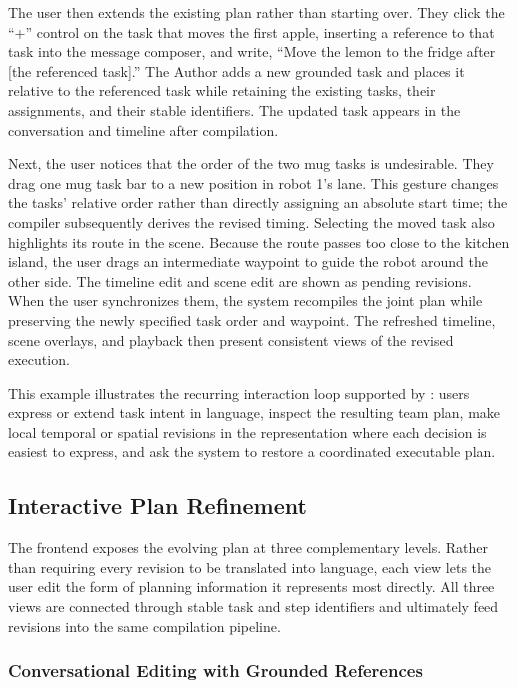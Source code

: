 The user then extends the existing plan rather than starting over.
They click the ``+'' control on the task that moves the first apple, inserting a reference to that task into the message composer, and write, ``Move the lemon to the fridge after [the referenced task].''
The Author adds a new grounded task and places it relative to the referenced task while retaining the existing tasks, their assignments, and their stable identifiers.
The updated task appears in the conversation and timeline after compilation.

Next, the user notices that the order of the two mug tasks is undesirable.
They drag one mug task bar to a new position in robot 1's lane.
This gesture changes the tasks' relative order rather than directly assigning an absolute start time; the compiler subsequently derives the revised timing.
Selecting the moved task also highlights its route in the scene.
Because the route passes too close to the kitchen island, the user drags an intermediate waypoint to guide the robot around the other side.
The timeline edit and scene edit are shown as pending revisions.
When the user synchronizes them, the system recompiles the joint plan while preserving the newly specified task order and waypoint.
The refreshed timeline, scene overlays, and playback then present consistent views of the revised execution.

This example illustrates the recurring interaction loop supported by \oursystem{}: users express or extend task intent in language, inspect the resulting team plan, make local temporal or spatial revisions in the representation where each decision is easiest to express, and ask the system to restore a coordinated executable plan.

\subsection{Interactive Plan Refinement}
\label{sec:interactive-refinement}

The frontend exposes the evolving plan at three complementary levels.
Rather than requiring every revision to be translated into language, each view lets the user edit the form of planning information it represents most directly.
All three views are connected through stable task and step identifiers and ultimately feed revisions into the same compilation pipeline.

\subsubsection{Conversational Editing with Grounded References}

